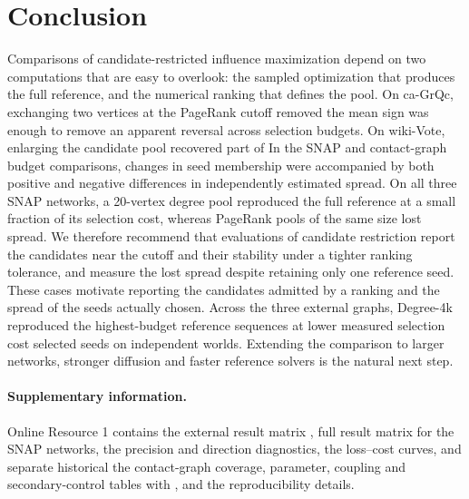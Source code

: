 \documentclass[smallextended]{svjour3}
\providecommand{\DIFaddtex}[1]{{\protect\color{blue} \sf #1}} %
\providecommand{\DIFdeltex}[1]{{\protect\color{red} \scriptsize #1}} %
\providecommand{\DIFaddbegin}{} %
\providecommand{\DIFaddend}{} %
\providecommand{\DIFdelbegin}{} %
\providecommand{\DIFdelend}{} %
\providecommand{\DIFadd}[1]{\texorpdfstring{\DIFaddtex{#1}}{#1}} %
\providecommand{\DIFdel}[1]{\texorpdfstring{\DIFdeltex{#1}}{}} %
\providecommand{\DIFscaledelfig}{0.5}
\newlength{\DIFdelgraphicswidth} %
\newlength{\DIFdelgraphicsheight} %
\providecommand{\DIFaddincludegraphics}[2][]{{\color{blue}\fbox{\DIFOincludegraphics[#1]{#2}}}} %
\providecommand{\DIFdelincludegraphics}[2][]{%
\sbox{\DIFdelgraphicsbox}{\DIFOincludegraphics[#1]{#2}}%
\settoboxwidth{\DIFdelgraphicswidth}{\DIFdelgraphicsbox} %
\settoboxtotalheight{\DIFdelgraphicsheight}{\DIFdelgraphicsbox} %
\scalebox{\DIFscaledelfig}{%
\parbox[b]{\DIFdelgraphicswidth}{\usebox{\DIFdelgraphicsbox}\\[-\baselineskip] \rule{\DIFdelgraphicswidth}{0em}}\llap{\resizebox{\DIFdelgraphicswidth}{\DIFdelgraphicsheight}{%
\setlength{\unitlength}{\DIFdelgraphicswidth}%
\begin{picture}(1,1)%
\thicklines\linethickness{2pt} %
{\color[rgb]{1,0,0}\put(0,0){\framebox(1,1){}}}%
{\color[rgb]{1,0,0}\put(0,0){\line( 1,1){1}}}%
{\color[rgb]{1,0,0}\put(0,1){\line(1,-1){1}}}%
\end{picture}%
}\hspace*{3pt}}} %
} %
\DeclareRobustCommand{\DIFaddbegin}{\DIFOaddbegin \let\includegraphics\DIFaddincludegraphics} %
\DeclareRobustCommand{\DIFaddend}{\DIFOaddend \let\includegraphics\DIFOincludegraphics} %
\DeclareRobustCommand{\DIFdelbegin}{\DIFOdelbegin \let\includegraphics\DIFdelincludegraphics} %
\DeclareRobustCommand{\DIFdelend}{\DIFOaddend \let\includegraphics\DIFOincludegraphics} %
\begin{document}
\section{Conclusion}
\DIFaddbegin \DIFadd{Comparisons of candidate-restricted influence maximization depend on two computations that are easy to overlook: the sampled optimization that produces the full reference, and the numerical ranking that defines the pool. }\DIFaddend On ca-GrQc, exchanging two vertices at the PageRank cutoff \DIFdelbegin \DIFdel{removed the mean sign }\DIFdelend \DIFaddbegin \DIFadd{was enough to remove an apparent }\DIFaddend reversal across selection budgets. \DIFdelbegin \DIFdel{On wiki-Vote, enlarging the candidate pool recovered part of }\DIFdelend \DIFaddbegin \DIFadd{In the SNAP and contact-graph budget comparisons, changes in seed membership were accompanied by both positive and negative differences in independently estimated spread. On all three SNAP networks, a 20-vertex degree pool reproduced the full reference at a small fraction of its selection cost, whereas PageRank pools of the same size lost spread. We therefore recommend that evaluations of candidate restriction report the candidates near the cutoff and their stability under a tighter ranking tolerance, and measure }\DIFaddend the \DIFdelbegin \DIFdel{lost }\DIFdelend spread \DIFdelbegin \DIFdel{despite retaining only one reference seed. These cases motivate reporting the candidates admitted by a ranking and the spread }\DIFdelend of the \DIFdelbegin \DIFdel{seeds actually chosen. Across the three external graphs, Degree-4k reproduced the highest-budget reference sequences at lower measured selection cost}\DIFdelend \DIFaddbegin \DIFadd{selected seeds on independent worlds. Extending the comparison to larger networks, stronger diffusion and faster reference solvers is the natural next step}\DIFaddend .

\paragraph{Supplementary information.} Online Resource 1 contains the \DIFdelbegin \DIFdel{external result matrix , }\DIFdelend \DIFaddbegin \DIFadd{full result matrix for the SNAP networks, the }\DIFaddend precision and direction diagnostics, \DIFaddbegin \DIFadd{the }\DIFaddend loss--cost curves, \DIFdelbegin \DIFdel{and separate historical }\DIFdelend \DIFaddbegin \DIFadd{the contact-graph }\DIFaddend coverage, parameter, coupling and secondary-control tables\DIFdelbegin \DIFdel{with }\DIFdelend \DIFaddbegin \DIFadd{, and the }\DIFaddend reproducibility details.
\end{document}

